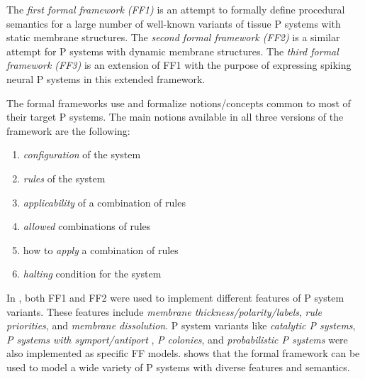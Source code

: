 \documentclass{article}
\begin{document}
The \emph{first formal framework (FF1)} \cite{ff-static} is an attempt to formally define procedural 
semantics for a large number of well-known variants of tissue P systems with static membrane         
structures. The \emph{second formal framework (FF2)} \cite{ff-dynamic} is a similar attempt for P    
systems with dynamic membrane structures. The \emph{third formal framework (FF3)} \cite{ff-snp} is   
an extension of FF1 with the purpose of expressing spiking neural P systems \cite{snp} in this       
extended framework.                                                                                  
                                                                                                     
The formal frameworks use and formalize notions/concepts common to most of their target P systems.   
The main notions available in all three versions of the framework are the following:                 
                                                                                                     
\begin{enumerate}                                                                                    
\item \emph{configuration} of the system                                                             
\item \emph{rules} of the system                                                                     
\item \emph{applicability} of a combination of rules                                                 
\item \emph{allowed} combinations of rules                                                           
\item how to \emph{apply} a combination of rules                                                     
\item \emph{halting} condition for the system                                                        
\end{enumerate}      


In \cite{ff-using}, both FF1 and FF2 were used to implement different features of P system variants. 
These features include \emph{membrane thickness/polarity/labels}, \emph{rule priorities}, and        
\emph{membrane dissolution}. P system variants like \emph{catalytic P systems}, \emph{P systems with 
symport/antiport} \cite{sym-anti-port}, \emph{P colonies}, and \emph{probabilistic P systems} were   
also implemented as specific FF models. \cite{ff-using} shows that the formal framework can be used  
to model a wide variety of P systems with diverse features and semantics.                            
                                                                                                     
\end{document}
